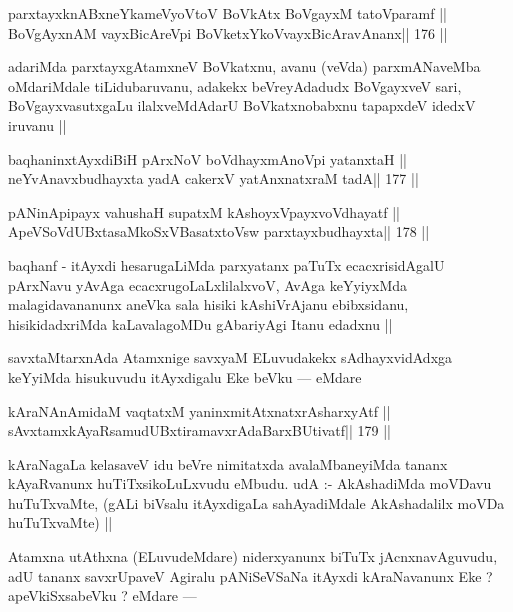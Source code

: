 \begin{shl}
parxtayxknABxneYkameVyoV\s toV BoVkAtx BoVgayxM tatoV\s paramf ||
BoVgAyxnAM vayxBicAreV\s pi BoVketxYkoV\s vayxBicAravAnanx\hfill || 176 ||
\end{shl}

\begin{artha}
adariMda parxtayxgAtamxneV BoVkatxnu, avanu (veVda) parxmANaveMba oMdariMdale tiLidubaruvanu, adakekx beVreyAdadudx BoVgayxveV sari, BoVgayxvasutxgaLu ilalxveMdAdarU BoVkatxnobabxnu tapapxdeV idedxV iruvanu ||
\end{artha}

\begin{shl}
baqhaninxtAyxdiBiH pArxNoV boVdhayxmAnoV\s pi yatanxtaH ||
neYvAnavxbudhayxta yadA cakerxV yatAnxnatxraM tadA\hfill || 177 ||
\end{shl}

\begin{shl}
pANinA\s\s pipayx vahushaH supatxM kAshoyxV\s payxvoVdhayatf ||
ApeVSoVdUBxtasaMkoSxVBasatxtoV\s sw parxtayxbudhayxta\hfill || 178 ||
\end{shl}

\begin{artha}
baqhanf - itAyxdi hesarugaLiMda parxyatanx paTuTx ecacxrisidAgalU pArxNavu yAvAga ecacxrugoLaLxlilalxvoV, AvAga keYyiyxMda malagidavananunx aneVka sala hisiki kAshiVrAjanu ebibxsidanu, hisikidadxriMda kaLavalagoMDu gAbariyAgi Itanu edadxnu ||
\end{artha}

\begin{artha}
savxtaMtarxnAda Atamxnige savxyaM ELuvudakekx sAdhayxvidAdxga keYyiMda hisukuvudu itAyxdigalu Eke beVku --- eMdare 
\end{artha}

\begin{shl}
kAraNAnAmidaM vaqtatxM yaninxmitAtxnatxrAsharxyAtf ||
sAvxtamxkAyaRsamudUBxtiramavxrAdaBarxBUtivatf\hfill || 179 ||
\end{shl}

\begin{artha}
kAraNagaLa kelasaveV idu beVre nimitatxda avalaMbaneyiMda tananx kAyaRvanunx huTiTxsikoLuLxvudu eMbudu. udA :- AkAshadiMda moVDavu huTuTxvaMte, (gALi biVsalu itAyxdigaLa sahAyadiMdale AkAshadalilx moVDa huTuTxvaMte) ||
\end{artha}

\begin{artha}
Atamxna utAthxna (ELuvudeMdare) niderxyanunx biTuTx jAcnxnavAguvudu, adU tananx savxrUpaveV Agiralu pANiSeVSaNa itAyxdi kAraNavanunx Eke ? apeVkiSxsabeVku ? eMdare ---
\end{artha}

